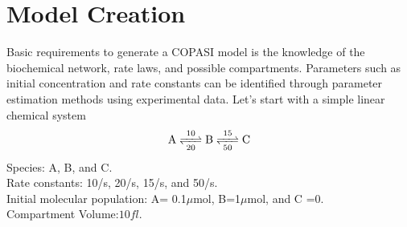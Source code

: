 \documentclass[10pt]{article}
\theoremstyle{definition}
\theoremstyle{remark}
\begin{document}
	\section{Model Creation}
	Basic requirements to generate a COPASI model is the knowledge of the biochemical network, rate laws, and possible compartments. Parameters such as initial concentration and rate constants can be identified through parameter estimation methods using experimental data. Let's start with a simple linear chemical system
	\[\ce{A <=>[10][20] B <=>[15][50] C}\]
	Species: A, B, and C.\\
	Rate constants: 10/s, 20/s, 15/s, and 50/s.\\
	Initial molecular population: A= 0.1$\mu$mol, B=1$\mu$mol, and C =$0$.\\
	Compartment Volume:$10 fl$.\\
\end{document}
